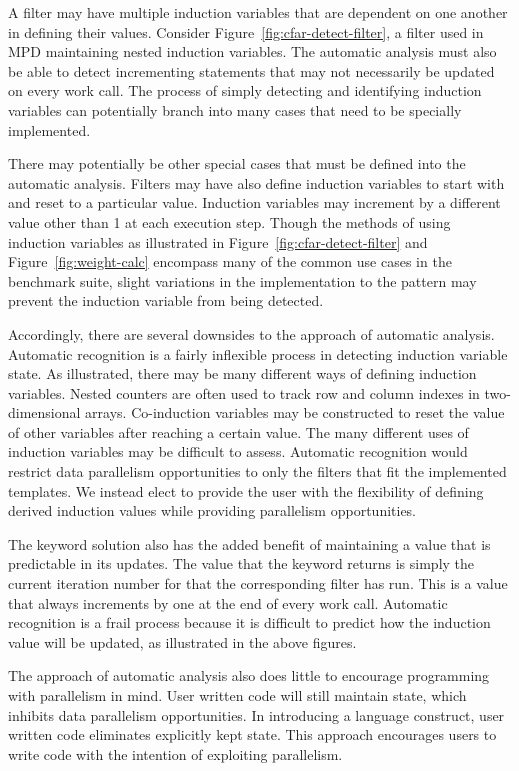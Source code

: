 A filter may have multiple induction variables that are dependent on one another in defining their values.  Consider Figure~\ref{fig:cfar-detect-filter}, a filter used in MPD maintaining nested induction variables.  The automatic analysis must also be able to detect incrementing statements that may not necessarily be updated on every work call.  The process of simply detecting and identifying induction variables can potentially branch into many cases that need to be specially implemented.

There may potentially be other special cases that must be defined into the automatic analysis.  Filters may have also define induction variables to start with and reset to a particular value.  Induction variables may increment by a different value other than 1 at each execution step.  Though the methods of using induction variables as illustrated in Figure~\ref{fig:cfar-detect-filter} and Figure~\ref{fig:weight-calc} encompass many of the common use cases in the benchmark suite, slight variations in the implementation to the pattern may prevent the induction variable from being detected.

Accordingly, there are several downsides to the approach of automatic analysis.  Automatic recognition is a fairly inflexible process in detecting induction variable state.  As illustrated, there may be many different ways of defining induction variables.  Nested counters are often used to track row and column indexes in two-dimensional arrays.  Co-induction variables may be constructed to reset the value of other variables after reaching a certain value.  The many different uses of induction variables may be difficult to assess.  Automatic recognition would restrict data parallelism opportunities to only the filters that fit the implemented templates.  We instead elect to provide the user with the flexibility of defining derived induction values while providing parallelism opportunities.  

The keyword solution also has the added benefit of maintaining a value that is predictable in its updates.  The value that the keyword returns is simply the current iteration number for that the corresponding filter has run.  This is a value that always increments by one at the end of every work call.  Automatic recognition is a frail process because it is difficult to predict how the induction value will be updated, as illustrated in the above figures.  

The approach of automatic analysis also does little to encourage programming with parallelism in mind.  User written code will still maintain state, which inhibits data parallelism opportunities.  In introducing a language construct, user written code eliminates explicitly kept state.  This approach encourages users to write code with the intention of exploiting parallelism.


